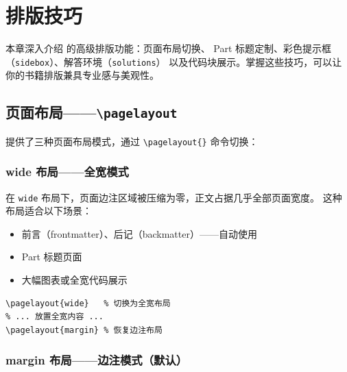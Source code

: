 
\setchapterpreamble[u]{\margintoc}
\chapter{排版技巧}

本章深入介绍  的高级排版功能：页面布局切换、
Part 标题定制、彩色提示框（\texttt{sidebox}）、解答环境（\texttt{solutions}）
以及代码块展示。掌握这些技巧，可以让你的书籍排版兼具专业感与美观性。


\section{页面布局——\texttt{\textbackslash pagelayout}}


 提供了三种页面布局模式，通过
\lstinline|\pagelayout{}| 命令切换：

\subsection{wide 布局——全宽模式}

在 \texttt{wide} 布局下，页面边注区域被压缩为零，正文占据几乎全部页面宽度。
这种布局适合以下场景：
\begin{itemize}
    \item 前言（frontmatter）、后记（backmatter）——自动使用
    \item Part 标题页面
    \item 大幅图表或全宽代码展示
\end{itemize}

\begin{lstlisting}
\pagelayout{wide}   % 切换为全宽布局
% ... 放置全宽内容 ...
\pagelayout{margin} % 恢复边注布局
\end{lstlisting}

\subsection{margin 布局——边注模式（默认）}

